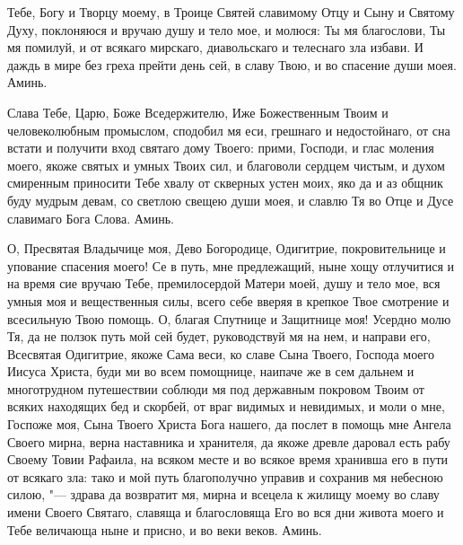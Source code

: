 Тебе, Богу и Творцу моему, в Троице Святей славимому Отцу и Сыну и Святому Духу, поклоняюся и вручаю душу и тело мое, и молюся: Ты мя благослови, Ты мя помилуй, и от всякаго мирскаго, диавольскаго и телеснаго зла избави. И даждь в мире без греха прейти день сей, в славу Твою, и во спасение души моея. Аминь.


Слава Тебе, Царю, Боже Вседержителю, Иже Божественным Твоим и человеколюбным промыслом, сподобил мя еси, грешнаго и недостойнаго, от сна встати и получити вход святаго дому Твоего: прими, Господи, и глас моления моего, якоже святых и умных Твоих сил, и благоволи сердцем чистым, и духом смиренным приносити Тебе хвалу от скверных устен моих, яко да и аз общник буду мудрым девам, со светлою свещею души моея, и славлю Тя во Отце и Дусе славимаго Бога Слова. Аминь.





\mychapterending






О, Пресвятая Владычице моя, Дево Богородице, Одигитрие, покровительнице и упование спасения моего! Се в путь, мне предлежащий, ныне хощу отлучитися и на время сие вручаю Тебе, премилосердой Матери моей, душу и тело мое, вся умныя моя и вещественныя силы, всего себе вверяя в крепкое Твое смотрение и всесильную Твою помощь. О, благая Спутнице и Защитнице моя! Усердно молю Тя, да не ползок путь мой сей будет, руководствуй мя на нем, и направи его, Всесвятая Одигитрие, якоже Сама веси, ко славе Сына Твоего, Господа моего Иисуса Христа, буди ми во всем помощнице, наипаче же в сем дальнем и многотрудном путешествии соблюди мя под державным покровом Твоим от всяких находящих бед и скорбей, от враг видимых и невидимых, и моли о мне, Госпоже моя, Сына Твоего Христа Бога нашего, да послет в помощь мне Ангела Своего мирна, верна наставника и хранителя, да якоже древле даровал есть рабу Своему Товии Рафаила, на всяком месте и во всякое время хранивша его в пути от всякаго зла: тако и мой путь благополучно управив и сохранив мя небесною силою, "--- здрава да возвратит мя, мирна и всецела к жилищу моему во славу имени Своего Святаго, славяща и благословяща Его во вся дни живота моего и Тебе величающа ныне и присно, и во веки веков. Аминь.





